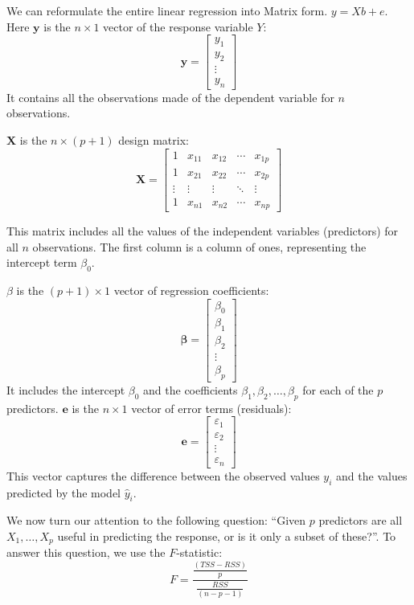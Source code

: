 We can reformulate the entire linear regression into Matrix form. $y = Xb+e$. Here \(\mathbf{y}\) is the \( n \times 1 \) vector of the response variable \( Y \):
\[
	\mathbf{y} = \begin{bmatrix} y_1 \\ y_2 \\ \vdots \\ y_n \end{bmatrix}
\]
It contains all the observations made of the dependent variable for \(n\) observations.

\(\mathbf{X}\) is the \( n \times (p+1) \) design matrix:
\[
	\mathbf{X} = \begin{bmatrix} 1 & x_{11} & x_{12} & \cdots & x_{1p} \\ 1 & x_{21} & x_{22} & \cdots & x_{2p} \\ \vdots & \vdots & \vdots & \ddots & \vdots \\ 1 & x_{n1} & x_{n2} & \cdots & x_{np} \end{bmatrix}
\]

This matrix includes all the values of the independent variables (predictors) for all \( n \) observations. The first column is a column of ones, representing the intercept term \( \beta_0 \).

	{\({\beta}\)} is the \( (p+1) \times 1 \) vector of regression coefficients:
\[
	\boldsymbol{\beta} = \begin{bmatrix} \beta_0 \\ \beta_1 \\ \beta_2 \\ \vdots \\ \beta_p \end{bmatrix}
\]
It includes the intercept \( \beta_0 \) and the coefficients \( \beta_1, \beta_2, \ldots, \beta_p \) for each of the \( p \) predictors.
	{\(\mathbf{e}\)} is the \( n \times 1 \) vector of error terms (residuals):
\[
	\mathbf{e} = \begin{bmatrix} \varepsilon_1 \\ \varepsilon_2 \\ \vdots \\ \varepsilon_n \end{bmatrix}
\]
This vector captures the difference between the observed values \( y_i \) and the values predicted by the model \( \hat{y}_i \).


We now turn our attention to the following question: ``Given $p$ predictors are all $X_{1}, \ldots, X_{p}$ useful in predicting the response, or is it only a subset of these?''. To answer this question, we use the $F$-statistic:
\begin{equation}
	F = \frac{\frac{(TSS-RSS)}{p}}{\frac{RSS}{(n-p-1)}}
\end{equation}

